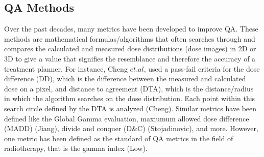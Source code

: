 \documentclass[12pt]{article}
\begin{document}
\subsection{QA Methods}
Over the past decades, many metrics have been developed to improve QA. These methods are mathematical formulas/algorithms that often searches through and compares the calculated and measured dose distributions (dose images) in 2D or 3D to give a value that signifies the resemblance and therefore the accuracy of a treatment planner. For instance, Cheng $et. al$, used a pass-fail criteria for the dose difference (DD), which is the difference between the measured and calculated dose on a pixel, and distance to agreement (DTA), which is the distance/radius in which the algorithm searches on the dose distribution. Each point within this search circle defined by the DTA is analyzed (Cheng). Similar metrics have been defined like the Global Gamma evaluation, maxiumum allowed dose difference (MADD) (Jiang), divide and conquer (D\&C) (Stojadinovic), and more. However, one metric has been defined as the standard of QA metrics in the field of radiotherapy, that is the gamma index (Low).
\end{document}
